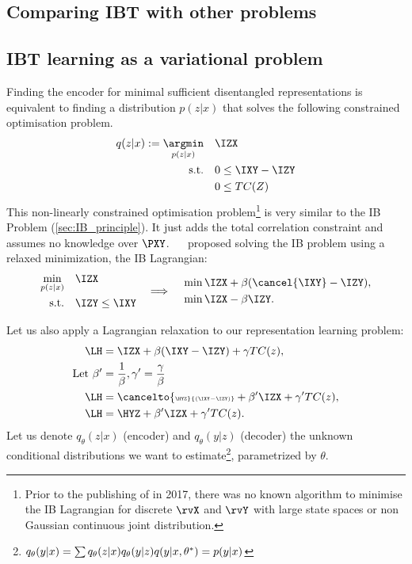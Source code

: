 \subsection{Comparing IBT with other problems}
\subsection{IBT learning as a variational problem}
    Finding the encoder for minimal sufficient disentangled representations is equivalent to finding a distribution $p(z|x)$ that solves the following constrained optimisation problem.
    \begin{align}
        q(z|x):=\underset{p(z|x)}{\argmin} \quad  & \IZX  \\
        \textrm{s.t.}\quad
        & 0 \leq \IXY - \IZY \nonumber\\
        \quad & 0 \leq TC(Z)\nonumber
    \end{align}
    This non-linearly constrained optimisation problem\footnote{Prior to the publishing of \cite{alemi:2016} in 2017, there was no known algorithm to minimise the IB Lagrangian for discrete $\rvX$ and $\rvY$ with large state spaces or non Gaussian continuous joint distribution.} is very similar to the IB Problem (\cref{sec:IB_principle}). It just adds the total correlation constraint and assumes no knowledge over $\PXY$. ~\citeauthor{tishby:1999}~\cite{tishby:1999} proposed solving the IB problem using a relaxed minimization, the IB Lagrangian:
    \begin{equation}
        \begin{split}
        \underset{p(z|x)}{\min} \quad  & \IZX  \\
        \textrm{s.t.}\quad & \IZY \leq \IXY \\
        \end{split}
        \quad \Longrightarrow \quad
        \begin{split}
            &\min \IZX + \beta (\cancel{\IXY} - \IZY),\\
            &\min \IZX - \beta \IZY.
        \end{split}
    \end{equation}

    Let us also apply a Lagrangian relaxation to our representation learning problem:
    \begin{align}
        \LH &=  \IZX + \beta (\IXY - \IZY) + \gamma TC(z),\\
        \text{Let }\beta'&= \frac{1}{\beta}, \gamma'= \frac{\gamma}{\beta}\\
        \LH &=  \cancelto{\scriptscriptstyle \HYZ}{(\IXY - \IZY)} + \beta' \IZX + \gamma' TC(z),\\
        \LH &=  \HYZ + \beta' \IZX + \gamma' TC(z).
    \end{align}
    Let us denote $q_\theta(z|x)$ (encoder) and $q_\theta(y|z)$ (decoder) the unknown conditional distributions we want to estimate\footnote{$q_\theta(y|x)=\sum q_\theta(z|x) q_\theta(y|z)\\q(y|x,\theta^*)=p(y|x)$
    }, parametrized by $\theta$.

